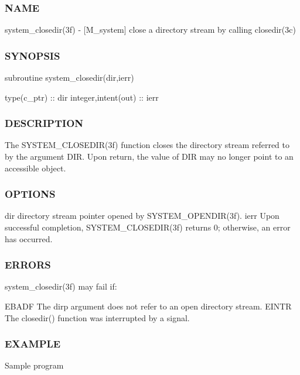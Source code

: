 \subsubsection*{N\+A\+ME}

system\+\_\+closedir(3f) -\/ \mbox{[}M\+\_\+system\mbox{]} close a directory stream by calling closedir(3c) \subsubsection*{S\+Y\+N\+O\+P\+S\+IS}

subroutine system\+\_\+closedir(dir,ierr)

type(c\+\_\+ptr) \+:\+: dir integer,intent(out) \+:\+: ierr \subsubsection*{D\+E\+S\+C\+R\+I\+P\+T\+I\+ON}

The S\+Y\+S\+T\+E\+M\+\_\+\+C\+L\+O\+S\+E\+D\+I\+R(3f) function closes the directory stream referred to by the argument D\+IR. Upon return, the value of D\+IR may no longer point to an accessible object. \subsubsection*{O\+P\+T\+I\+O\+NS}

dir directory stream pointer opened by S\+Y\+S\+T\+E\+M\+\_\+\+O\+P\+E\+N\+D\+I\+R(3f). ierr Upon successful completion, S\+Y\+S\+T\+E\+M\+\_\+\+C\+L\+O\+S\+E\+D\+I\+R(3f) returns 0; otherwise, an error has occurred. \subsubsection*{E\+R\+R\+O\+RS}

system\+\_\+closedir(3f) may fail if\+:

E\+B\+A\+DF The dirp argument does not refer to an open directory stream. E\+I\+N\+TR The closedir() function was interrupted by a signal. \subsubsection*{E\+X\+A\+M\+P\+LE}

Sample program

